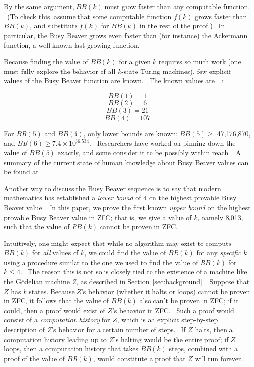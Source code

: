 \documentclass[11pt]{article}
\newcommand{\statenumcomma}{8,013, }
\begin{document}
By the same argument, $BB(k)$ must grow faster than any computable function. \ (To check this, assume that some computable function $f(k)$ grows faster than $BB(k)$, and substitute $f(k)$ for $BB(k)$ in the rest of the proof.) \ In particular, the Busy Beaver grows even faster than (for instance) the Ackermann function, a well-known fast-growing function.

Because finding the value of $BB(k)$ for a given $k$ requires so much work (one must fully explore the behavior of all $k$-state Turing machines), few explicit values of the Busy Beaver function are known. \ The known values are~\cite{bbsmall}~\cite{bbfour}:

$$BB(1) = 1$$
$$BB(2) = 6$$
$$BB(3) = 21$$
$$BB(4) = 107$$

For $BB(5)$ and $BB(6)$, only lower bounds are known: $BB(5) \ge$ 47,176,870, and $BB(6) \ge 7.4 \times 10^{\textrm{36,534}}$. \ Researchers have worked on pinning down the value of $BB(5)$ exactly, and some consider it to be possibly within reach. \ A summary of the current state of human knowledge about Busy Beaver values can be found at \cite{bbvalues}.

Another way to discuss the Busy Beaver sequence is to say that modern mathematics has established a \emph{lower bound} of $4$ on the highest provable Busy Beaver value. \ In this paper, we prove the first known \emph{upper bound} on the highest provable Busy Beaver value in ZFC; that is, we give a value of $k$, namely \statenumcomma such that the value of $BB(k)$ cannot be proven in ZFC.

Intuitively, one might expect that while no algorithm may exist to compute $BB(k)$ for \emph{all} values of $k$, we could find the value of $BB(k)$ for any \emph{specific} $k$ using a procedure similar to the one we used to find the value of $BB(k)$ for $k \le 4$. \ The reason this is not so is closely tied to the existence of a machine like the G\"{o}delian machine $Z$, as described in Section~\ref{sec:background}. \ Suppose that $Z$ has $k$ states. Because $Z$'s behavior (whether it halts or loops) cannot be proven in ZFC, it follows that the value of $BB(k)$ also can't be proven in ZFC; if it could, then a proof would exist of $Z$'s behavior in ZFC. \ Such a proof would consist of a \emph{computation history} for $Z$, which is an explicit step-by-step description of $Z$'s behavior for a certain number of steps. \ If $Z$ halts, then a computation history leading up to $Z$'s halting would be the entire proof; if $Z$ loops, then a computation history that takes $BB(k)$ steps, combined with a proof of the value of $BB(k)$, would constitute a proof that $Z$ will run forever.
\end{document}
